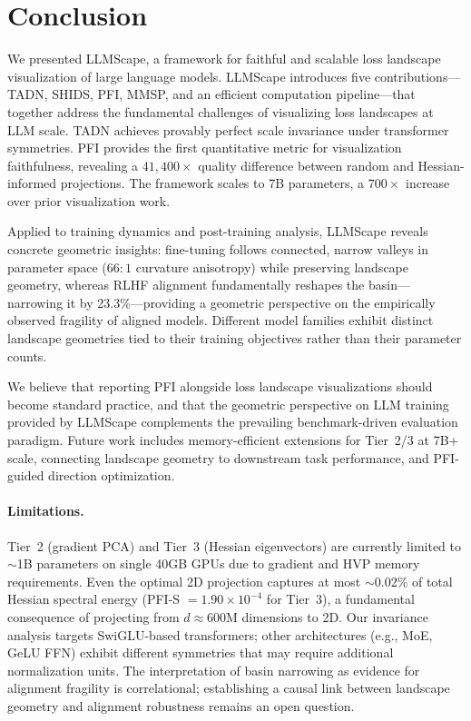 \documentclass{article}
\begin{document}
\section{Conclusion}
\label{sec:conclusion}

We presented LLMScape, a framework for faithful and scalable loss landscape visualization of large language models. LLMScape introduces five contributions---TADN, SHIDS, PFI, MMSP, and an efficient computation pipeline---that together address the fundamental challenges of visualizing loss landscapes at LLM scale. TADN achieves provably perfect scale invariance under transformer symmetries. PFI provides the first quantitative metric for visualization faithfulness, revealing a $41{,}400\times$ quality difference between random and Hessian-informed projections. The framework scales to 7B parameters, a $700\times$ increase over prior visualization work.

Applied to training dynamics and post-training analysis, LLMScape reveals concrete geometric insights: fine-tuning follows connected, narrow valleys in parameter space ($66{:}1$ curvature anisotropy) while preserving landscape geometry, whereas RLHF alignment fundamentally reshapes the basin---narrowing it by 23.3\%---providing a geometric perspective on the empirically observed fragility of aligned models. Different model families exhibit distinct landscape geometries tied to their training objectives rather than their parameter counts.

We believe that reporting PFI alongside loss landscape visualizations should become standard practice, and that the geometric perspective on LLM training provided by LLMScape complements the prevailing benchmark-driven evaluation paradigm. Future work includes memory-efficient extensions for Tier~2/3 at 7B+ scale, connecting landscape geometry to downstream task performance, and PFI-guided direction optimization.

\paragraph{Limitations.}
Tier~2 (gradient PCA) and Tier~3 (Hessian eigenvectors) are currently limited to $\sim$1B parameters on single 40GB GPUs due to gradient and HVP memory requirements. Even the optimal 2D projection captures at most $\sim$0.02\% of total Hessian spectral energy (PFI-S $= 1.90 \times 10^{-4}$ for Tier~3), a fundamental consequence of projecting from $d \approx 600$M dimensions to 2D. Our invariance analysis targets SwiGLU-based transformers; other architectures (e.g., MoE, GeLU FFN) exhibit different symmetries that may require additional normalization units. The interpretation of basin narrowing as evidence for alignment fragility is correlational; establishing a causal link between landscape geometry and alignment robustness remains an open question.
\end{document}
